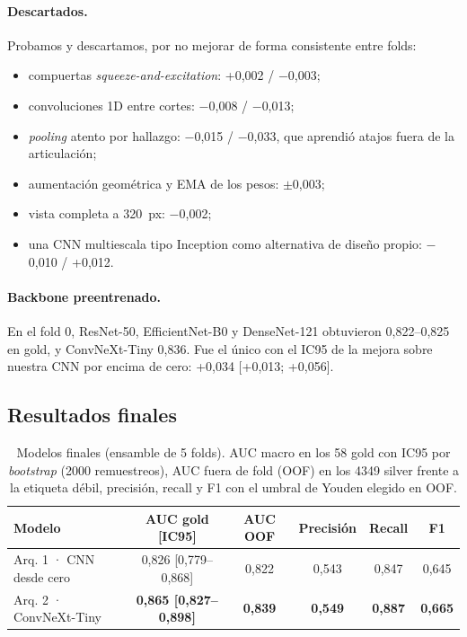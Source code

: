 \documentclass{article}
\begin{document}
\paragraph{Descartados.} Probamos y descartamos, por no mejorar de forma consistente entre folds:
\begin{itemize}
  \item compuertas \emph{squeeze-and-excitation}: +0,002 / $-$0,003;
  \item convoluciones 1D entre cortes: $-$0,008 / $-$0,013;
  \item \emph{pooling} atento por hallazgo: $-$0,015 / $-$0,033, que aprendió atajos fuera de la articulación;
  \item aumentación geométrica y EMA de los pesos: $\pm$0,003;
  \item vista completa a 320~px: $-$0,002;
  \item una CNN multiescala tipo Inception como alternativa de diseño propio: $-$0,010 / +0,012.
\end{itemize}

\paragraph{Backbone preentrenado.} En el fold 0, ResNet-50, EfficientNet-B0 y DenseNet-121 obtuvieron 0,822--0,825 en gold, y ConvNeXt-Tiny 0,836. Fue el único con el IC95 de la mejora sobre nuestra CNN por encima de cero: +0,034 [+0,013; +0,056].

\subsection{Resultados finales}

\begin{table}[t]
  \centering
  \caption{Modelos finales (ensamble de 5 folds). AUC macro en los 58 gold con IC95 por \emph{bootstrap} (2000 remuestreos), AUC fuera de fold (OOF) en los 4349 silver frente a la etiqueta débil, precisión, recall y F1 con el umbral de Youden elegido en OOF.}
  \label{tab:final}
  \footnotesize
  \setlength{\tabcolsep}{4pt}
  \begin{tabular}{lccccc}
    \toprule
    Modelo & AUC gold [IC95] & AUC OOF & Precisión & Recall & F1 \\
    \midrule
    Arq. 1 · CNN desde cero & 0,826 [0,779--0,868] & 0,822 & 0,543 & 0,847 & 0,645 \\
    Arq. 2 · ConvNeXt-Tiny & \textbf{0,865 [0,827--0,898]} & \textbf{0,839} & \textbf{0,549} & \textbf{0,887} & \textbf{0,665} \\
    \bottomrule
  \end{tabular}
\end{table}
\end{document}
